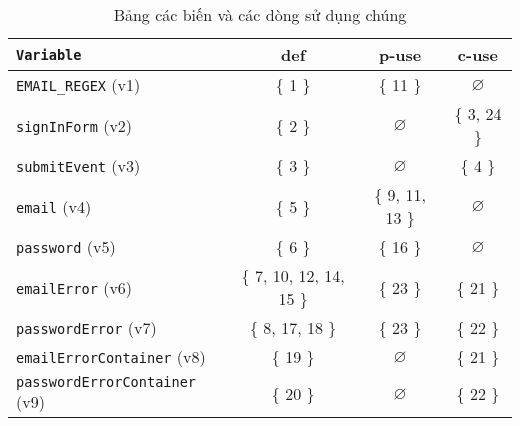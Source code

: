 \documentclass{article}
\begin{document}
\FloatBarrier{}
\begin{table}[htp]
    \centering
    \begin{tabular}{l|c|c|c}
        \texttt{Variable}                    & def                     & p-use           & c-use         \\
        \toprule
        \bottomrule
        \texttt{EMAIL\_REGEX} (v1)           & \{ 1 \}                 & \{ 11 \}        & $\varnothing$ \\
        \hline
        \texttt{signInForm} (v2)             & \{ 2 \}                 & $\varnothing$   & \{ 3, 24 \}   \\
        \hline
        \texttt{submitEvent} (v3)            & \{ 3 \}                 & $\varnothing$   & \{ 4 \}       \\
        \hline
        \texttt{email} (v4)                  & \{ 5 \}                 & \{ 9, 11, 13 \} & $\varnothing$ \\
        \hline
        \texttt{password} (v5)               & \{ 6 \}                 & \{ 16 \}        & $\varnothing$ \\
        \hline
        \texttt{emailError} (v6)             & \{ 7, 10, 12, 14, 15 \} & \{ 23 \}        & \{ 21 \}      \\
        \hline
        \texttt{passwordError} (v7)          & \{ 8, 17, 18 \}         & \{ 23 \}        & \{ 22 \}      \\
        \hline
        \texttt{emailErrorContainer} (v8)    & \{ 19 \}                & $\varnothing$   & \{ 21 \}      \\
        \hline
        \texttt{passwordErrorContainer} (v9) & \{ 20 \}                & $\varnothing$   & \{ 22 \}      \\
    \end{tabular}
    \caption{Bảng các biến và các dòng sử dụng chúng}
    {\label{table:variable-usage}}
\end{table}
\FloatBarrier{}
\end{document}
